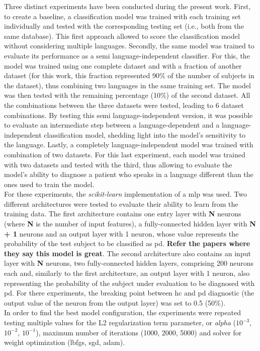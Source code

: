 Three distinct experiments have been conducted during the present work. First, to create a baseline, a classification model was trained with each training set individually and tested with the corresponding testing set (i.e., both from the same database). This first approach allowed to score the classification model without considering multiple languages. Secondly, the same model was trained to evaluate its performance as a semi language-independent classifier. For this, the model was trained using one complete dataset and with a fraction of another dataset (for this work, this fraction represented 90\% of the number of subjects in the dataset), thus combining two languages in the same training set. The model was then tested with the remaining percentage (10\%) of the second dataset. All the combinations between the three datasets were tested, leading to 6 dataset combinations. By testing this semi language-independent version, it was possible to evaluate an intermediate step between a language-dependent and a language-independent classification model, shedding light into the model's sensitivity to the language. Lastly, a completely language-independent model was trained with combination of two datasets. For this last experiment, each model was trained with two datasets and tested with the third, thus allowing to evaluate the model's ability to diagnose a patient who speaks in a language different than the ones used to train the model.
\\
For these experiments, the \textit{scikit-learn} implementation \cite{scikit-learn} of a \gls{mlp} was used. Two different architectures were tested to evaluate their ability to learn from the training data. The first architecture contains one entry layer with \textbf{N} neurons (where \textbf{N} is the number of input features), a fully-connected hidden layer with \textbf{N + 1} neurons and an output layer with 1 neuron, whose value represents the probability of the test subject to be classified as \gls{pd}. \textbf{Refer the papers where they say this model is great}. The second architecture also contains an input layer with \textbf{N} neurons, two fully-connected hidden layers, comprising 200 neurons each and, similarly to the first architecture, an output layer with 1 neuron, also representing the probability of the subject under evaluation to be diagnosed with \gls{pd}. For there experiments, the breaking point between \gls{hc} and \gls{pd} diagnostic (the output value of the neuron from the output layer) was set to 0.5 (50\%).
\\
In order to find the best model configuration, the experiments were repeated testing multiple values for the L2 regularization term parameter, or \textit{alpha} ($ 10^{-3} $, $ 10 ^{-2} $, $ 10 ^{-1} $), maximum number of iterations (1000, 2000, 5000) and solver for weight optimization (lbfgs, sgd, adam). 

